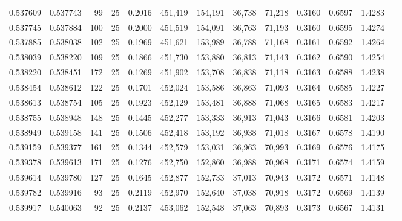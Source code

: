 \begin{tabular}{rrrrrrrrrrrrr}
0.537609 & 0.537743 &    99 &  25 &                                     0.2016 & 451,419 & 154,191 &  36,738 &  71,218 & 0.3160 & 0.6597 & 1.4283 \\
0.537745 & 0.537884 &   100 &  25 &                                     0.2000 & 451,519 & 154,091 &  36,763 &  71,193 & 0.3160 & 0.6595 & 1.4274 \\
0.537885 & 0.538038 &   102 &  25 &                                     0.1969 & 451,621 & 153,989 &  36,788 &  71,168 & 0.3161 & 0.6592 & 1.4264 \\
0.538039 & 0.538220 &   109 &  25 &                                     0.1866 & 451,730 & 153,880 &  36,813 &  71,143 & 0.3162 & 0.6590 & 1.4254 \\
0.538220 & 0.538451 &   172 &  25 &                                     0.1269 & 451,902 & 153,708 &  36,838 &  71,118 & 0.3163 & 0.6588 & 1.4238 \\
0.538454 & 0.538612 &   122 &  25 &                                     0.1701 & 452,024 & 153,586 &  36,863 &  71,093 & 0.3164 & 0.6585 & 1.4227 \\
0.538613 & 0.538754 &   105 &  25 &                                     0.1923 & 452,129 & 153,481 &  36,888 &  71,068 & 0.3165 & 0.6583 & 1.4217 \\
0.538755 & 0.538948 &   148 &  25 &                                     0.1445 & 452,277 & 153,333 &  36,913 &  71,043 & 0.3166 & 0.6581 & 1.4203 \\
0.538949 & 0.539158 &   141 &  25 &                                     0.1506 & 452,418 & 153,192 &  36,938 &  71,018 & 0.3167 & 0.6578 & 1.4190 \\
0.539159 & 0.539377 &   161 &  25 &                                     0.1344 & 452,579 & 153,031 &  36,963 &  70,993 & 0.3169 & 0.6576 & 1.4175 \\
0.539378 & 0.539613 &   171 &  25 &                                     0.1276 & 452,750 & 152,860 &  36,988 &  70,968 & 0.3171 & 0.6574 & 1.4159 \\
0.539614 & 0.539780 &   127 &  25 &                                     0.1645 & 452,877 & 152,733 &  37,013 &  70,943 & 0.3172 & 0.6571 & 1.4148 \\
0.539782 & 0.539916 &    93 &  25 &                                     0.2119 & 452,970 & 152,640 &  37,038 &  70,918 & 0.3172 & 0.6569 & 1.4139 \\
0.539917 & 0.540063 &    92 &  25 &                                     0.2137 & 453,062 & 152,548 &  37,063 &  70,893 & 0.3173 & 0.6567 & 1.4131 \\

\end{tabular}
